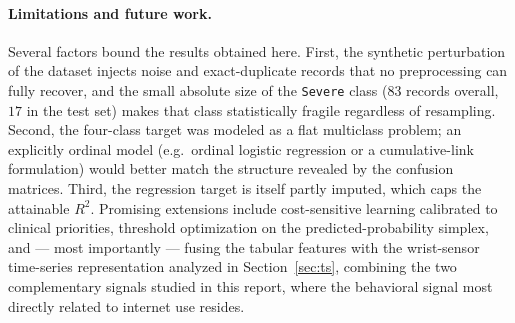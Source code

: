 \paragraph{Limitations and future work.} Several factors bound the results obtained here. First, the synthetic perturbation of the dataset injects noise and exact-duplicate records that no preprocessing can fully recover, and the small absolute size of the \texttt{Severe} class ($83$ records overall, $17$ in the test set) makes that class statistically fragile regardless of resampling. Second, the four-class target was modeled as a flat multiclass problem; an explicitly ordinal model (e.g.\ ordinal logistic regression or a cumulative-link formulation) would better match the structure revealed by the confusion matrices. Third, the regression target is itself partly imputed, which caps the attainable $R^2$. Promising extensions include cost-sensitive learning calibrated to clinical priorities, threshold optimization on the predicted-probability simplex, and --- most importantly --- fusing the tabular features with the wrist-sensor time-series representation analyzed in Section~\ref{sec:ts}, combining the two complementary signals studied in this report, where the behavioral signal most directly related to internet use resides.

\newpage






